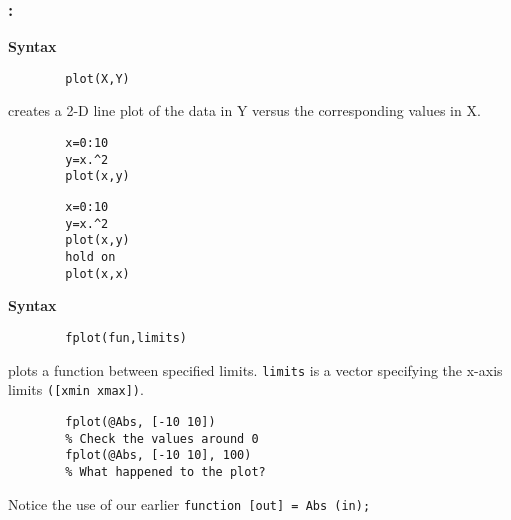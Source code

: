 \documentclass[11pt]{beamer}
\begin{document}
\begin{frame}[fragile]
	
	\frametitle{\secname : \subsecname}
	\vspace{-17pt}
	\begin{minipage}[t]{0.47\linewidth}
		\begin{block}{}
		\textbf{Syntax}
		\vspace{-5pt}
		\begin{verbatim}
		plot(X,Y)
		\end{verbatim}
		creates a 2-D line plot of the data in Y versus the corresponding values in X.
		\end{block}
		\vspace{-10pt}
		\begin{verbatim}
		x=0:10
		y=x.^2
		plot(x,y)
		\end{verbatim}
		\begin{verbatim}
		x=0:10
		y=x.^2
		plot(x,y)
		hold on
		plot(x,x)
		\end{verbatim}		
	\end{minipage}
	\hspace{7pt}
	\begin{minipage}[t]{0.47\linewidth}
		\begin{block}{}	
		\textbf{Syntax}
		\vspace{-5pt}
		\begin{verbatim}
		fplot(fun,limits) 
		\end{verbatim}
		plots a function between specified limits. \verb|limits| is a vector specifying the x-axis limits \verb|([xmin xmax])|.
	\end{block}
		\vspace{-10pt}
		\begin{verbatim}
		fplot(@Abs, [-10 10])
		% Check the values around 0
		fplot(@Abs, [-10 10], 100)	
		% What happened to the plot?	
		\end{verbatim}
		\vspace{-10pt}
		\begin{exampleblock}{}
		Notice the use of our earlier
		\verb|function [out] = Abs (in);|
		\end{exampleblock}				
	\end{minipage}
	
\end{frame}
\end{document}
